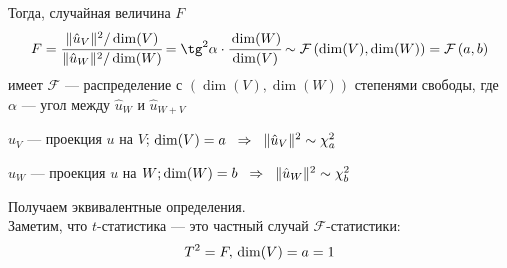 \documentclass[12pt]{article} %
\theoremstyle{definition} %
\def \hu{\hat{u}}
\def \cF{\mathcal{F}}
\def \cChi{\mathcal{\chi}}
\begin{document}
\begin{geom_def}
\begin{center}
\begin{tikzpicture}[x=0.75pt,y=0.75pt,yscale=-1,xscale=1]
\end{tikzpicture}
\end{center}
Тогда, случайная величина $F$ \[
        F = \cfrac{\lVert \hu_V \rVert ^2 / \dim(V)}{\lVert \hu_W \rVert ^2 / \dim(W)} =  {\tg}^2\alpha \cdot \cfrac{\dim(W)}{\dim(V)}\sim \cF\left(\dim(V), \dim(W)\right) = \cF\left(a, b\right)
    \]
    имеет $\cF$ — распределение с $\left(\dim(V), \dim(W)\right)$ степенями свободы, где $\alpha$ — угол между $\hu_W$  и $\hu_{W+V}$
\end{geom_def}  

\par\par\par
    $\hu_V$ — проекция $u$ на $V$; $\dim(V) =a \hspace{0.2cm} \Rightarrow \hspace{0.2cm} \lVert \hu_V \rVert ^2 \sim \cChi_a^2 \hspace{0.2cm}$\par
    $\hu_W$ — проекция $u$ на $W; \dim(W)=b \hspace{0.2cm} \Rightarrow \hspace{0.2cm} \lVert \hu_W \rVert ^2 \sim \cChi_b^2 \hspace{0.2cm}$\par
Получаем эквивалентные определения.
\[\]
Заметим, что $t$-статистика  — это частный случай $\cF$-статистики:
\[T^2 = F, \\ \dim(V) = a = 1\]
\end{document}

